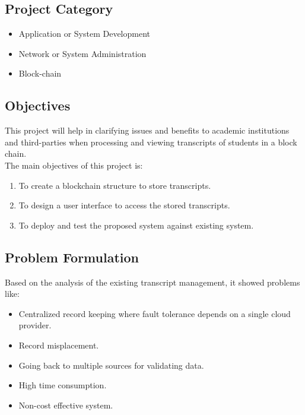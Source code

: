 

\subsection{Project Category}
\begin{itemize}
    \item Application or System Development
    \item Network or System Administration
    \item Block-chain
\end{itemize}

\noindent
\subsection{Objectives}
This project will help in clarifying issues and benefits to academic institutions and third-parties when processing and viewing transcripts of students in a block chain. \\
The main objectives of this project is:
\begin{enumerate}
    \item {To create a blockchain structure to store transcripts.}
    \item {To design a user interface to access the stored transcripts.}
    \item {To deploy and test the proposed system against existing system.}
\end{enumerate}

\subsection{Problem Formulation}
Based on the analysis of the existing transcript management, it showed problems like:
\begin{itemize}
    \item Centralized record keeping where fault tolerance depends on a single cloud provider.
    \item Record misplacement.
    \item Going back to multiple sources for validating data.
    \item High time consumption.
    \item Non-cost effective system.
\end{itemize}


